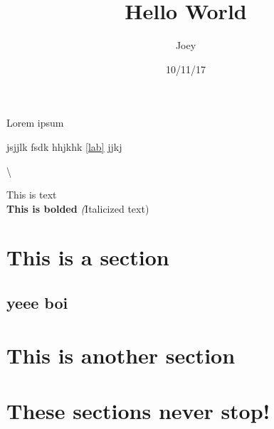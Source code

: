 \documentclass{article}
\begin{document}
\author{Joey}
\title{Hello World}
\date{10/11/17}

\maketitle
Lorem ipsum

jsjjlk \hfill{\linewidth=0.5in} fsdk
hhjkhk \ref{lab} jjkj

\textbackslash

This is text \\
\textbf{This is bolded}
\textit(Italicized text)

\section{This is a section}
\subsection{yeee boi\label{lab}}

\section{This is another section}

\section{These sections never stop!}
\end{document}
